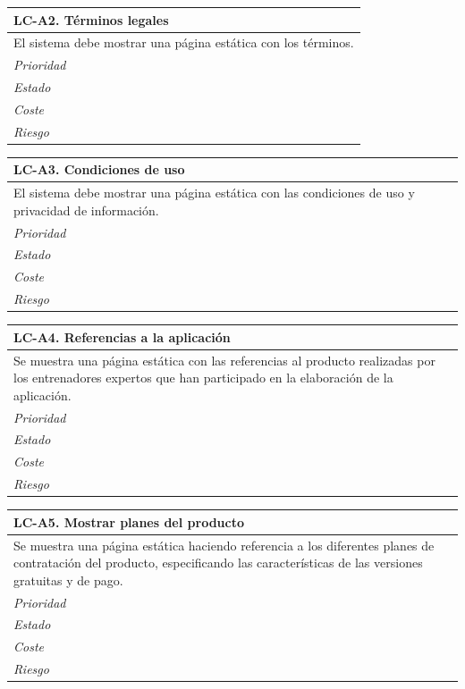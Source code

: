 	\begin{center}
		\begin{tabularx}{15cm}{|X|}
			\hline 
				\bf{LC-A2. Términos legales}\\
			\hline
				El sistema debe mostrar una página estática con los términos.\\
			\hline
				\it{Prioridad}\\
			\hline
				\it{Estado}\\
			\hline
				\it{Coste}\\
			\hline
				\it{Riesgo}\\
			\hline
		\end{tabularx}
	\end{center}
	
	\begin{center}
		\begin{tabularx}{15cm}{|X|}
			\hline 
				\bf{LC-A3. Condiciones de uso}\\
			\hline
				El sistema debe mostrar una página estática con las condiciones de uso y privacidad de información.\\
			\hline
				\it{Prioridad}\\
			\hline
				\it{Estado}\\
			\hline
				\it{Coste}\\
			\hline
				\it{Riesgo}\\
			\hline
		\end{tabularx}
	\end{center}
	
	\begin{center}
		\begin{tabularx}{15cm}{|X|}
			\hline 
				\bf{LC-A4. Referencias a la aplicación}\\
			\hline
				Se muestra una página estática con las referencias al producto realizadas por los entrenadores expertos que han participado en la elaboración de la aplicación.\\
			\hline
				\it{Prioridad}\\
			\hline
				\it{Estado}\\
			\hline
				\it{Coste}\\
			\hline
				\it{Riesgo}\\
			\hline
		\end{tabularx}
	\end{center}
	
	\begin{center}
		\begin{tabularx}{15cm}{|X|}
			\hline 
				\bf{LC-A5. Mostrar planes del producto}\\
			\hline
				Se muestra una página estática haciendo referencia a los diferentes planes de contratación del producto, especificando las características de las versiones gratuitas y de pago.\\
			\hline
				\it{Prioridad}\\
			\hline
				\it{Estado}\\
			\hline
				\it{Coste}\\
			\hline
				\it{Riesgo}\\
			\hline
		\end{tabularx}
	\end{center}		


